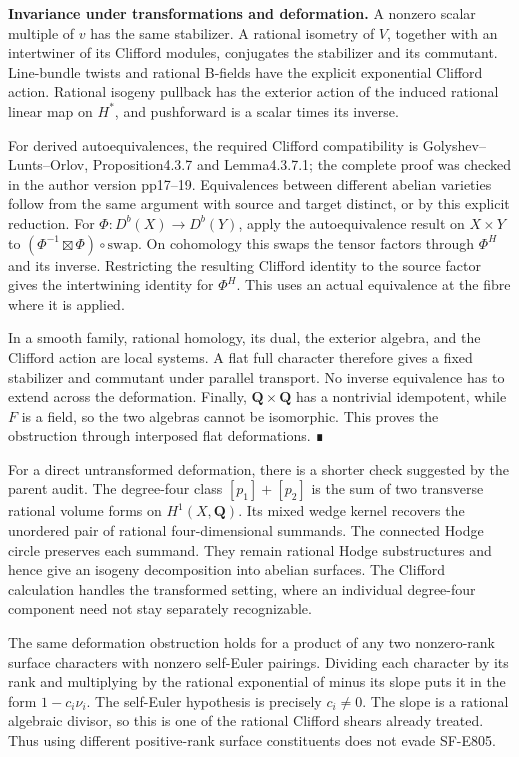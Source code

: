 \textbf{Invariance under transformations and deformation.} A nonzero
scalar multiple of \(v\) has the same stabilizer. A rational isometry of
\(V\), together with an intertwiner of its Clifford modules, conjugates
the stabilizer and its commutant. Line-bundle twists and rational
B-fields have the explicit exponential Clifford action. Rational isogeny
pullback has the exterior action of the induced rational linear map on
\(H^*\), and pushforward is a scalar times its inverse.

For derived autoequivalences, the required Clifford compatibility is
Golyshev--Lunts--Orlov, Proposition4.3.7 and Lemma4.3.7.1; the complete
proof was checked in the author version pp17--19. Equivalences between
different abelian varieties follow from the same argument with source
and target distinct, or by this explicit reduction. For
\(\Phi:D^b(X)\to D^b(Y)\), apply the autoequivalence result on
\(X\times Y\) to \((\Phi^{-1}\boxtimes\Phi)\circ\mathrm{swap}\). On
cohomology this swaps the tensor factors through \(\Phi^H\) and its
inverse. Restricting the resulting Clifford identity to the source
factor gives the intertwining identity for \(\Phi^H\). This uses an
actual equivalence at the fibre where it is applied.

In a smooth family, rational homology, its dual, the exterior algebra,
and the Clifford action are local systems. A flat full character
therefore gives a fixed stabilizer and commutant under parallel
transport. No inverse equivalence has to extend across the deformation.
Finally, \(\mathbf Q\times\mathbf Q\) has a nontrivial idempotent, while
\(F\) is a field, so the two algebras cannot be isomorphic. This proves
the obstruction through interposed flat deformations. ∎

For a direct untransformed deformation, there is a shorter check
suggested by the parent audit. The degree-four class \([p_1]+[p_2]\) is
the sum of two transverse rational volume forms on \(H^1(X,\mathbf Q)\).
Its mixed wedge kernel recovers the unordered pair of rational
four-dimensional summands. The connected Hodge circle preserves each
summand. They remain rational Hodge substructures and hence give an
isogeny decomposition into abelian surfaces. The Clifford calculation
handles the transformed setting, where an individual degree-four
component need not stay separately recognizable.

The same deformation obstruction holds for a product of any two
nonzero-rank surface characters with nonzero self-Euler pairings.
Dividing each character by its rank and multiplying by the rational
exponential of minus its slope puts it in the form \(1-c_i\nu_i\). The
self-Euler hypothesis is precisely \(c_i\ne0\). The slope is a rational
algebraic divisor, so this is one of the rational Clifford shears
already treated. Thus using different positive-rank surface constituents
does not evade SF-E805.

